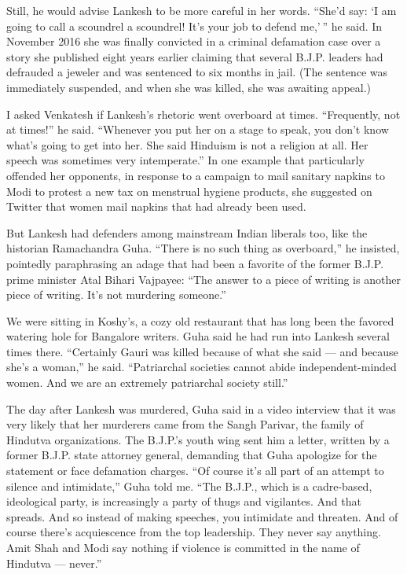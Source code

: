 Still, he would advise Lankesh to be more careful in her words. ``She'd
say: `I am going to call a scoundrel a scoundrel! It's your job to
defend me,' '' he said. In November 2016 she was finally convicted in a
criminal defamation case over a story she published eight years earlier
claiming that several B.J.P. leaders had defrauded a jeweler and was
sentenced to six months in jail. (The sentence was immediately
suspended, and when she was killed, she was awaiting appeal.)

I asked Venkatesh if Lankesh's rhetoric went overboard at times.
``Frequently, not at times!'' he said. ``Whenever you put her on a stage
to speak, you don't know what's going to get into her. She said Hinduism
is not a religion at all. Her speech was sometimes very intemperate.''
In one example that particularly offended her opponents, in response to
a campaign to mail sanitary napkins to Modi to protest a new tax on
menstrual hygiene products, she suggested on Twitter that women mail
napkins that had already been used.

But Lankesh had defenders among mainstream Indian liberals too, like the
historian Ramachandra Guha. ``There is no such thing as overboard,'' he
insisted, pointedly paraphrasing an adage that had been a favorite of
the former B.J.P. prime minister Atal Bihari Vajpayee: ``The answer to a
piece of writing is another piece of writing. It's not murdering
someone.''

We were sitting in Koshy's, a cozy old restaurant that has long been the
favored watering hole for Bangalore writers. Guha said he had run into
Lankesh several times there. ``Certainly Gauri was killed because of
what she said --- and because she's a woman,'' he said. ``Patriarchal
societies cannot abide independent-minded women. And we are an extremely
patriarchal society still.''

The day after Lankesh was murdered, Guha said in a video interview that
it was very likely that her murderers came from the Sangh Parivar, the
family of Hindutva organizations. The B.J.P.'s youth wing sent him a
letter, written by a former B.J.P. state attorney general, demanding
that Guha apologize for the statement or face defamation charges. ``Of
course it's all part of an attempt to silence and intimidate,'' Guha
told me. ``The B.J.P., which is a cadre-based, ideological party, is
increasingly a party of thugs and vigilantes. And that spreads. And so
instead of making speeches, you intimidate and threaten. And of course
there's acquiescence from the top leadership. They never say anything.
Amit Shah and Modi say nothing if violence is committed in the name of
Hindutva --- never.''

